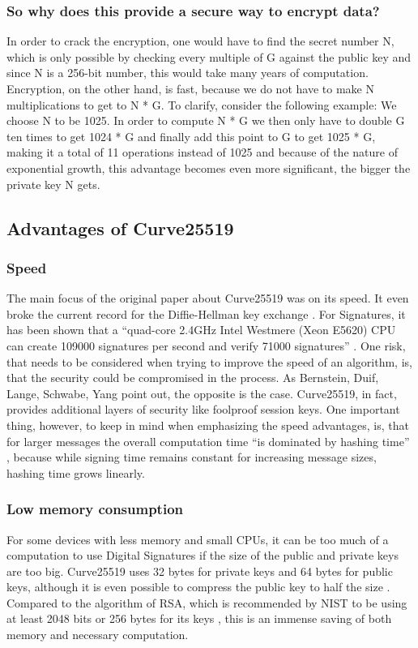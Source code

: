 \subsubsection{So why does this provide a secure way to encrypt data?}
In order to crack the encryption, one would have to find the secret number N, which is only possible by checking every multiple of G against the public key and since N is a 256-bit number, this would take many years of computation.
Encryption, on the other hand, is fast, because we do not have to make N multiplications to get to N * G. To clarify, consider the following example:
We choose N to be 1025. In order to compute N * G we then only have to double G ten times to get 1024 * G and finally add this point to G to get 1025 * G, making it a total of 11 operations instead of 1025 and because of the nature of exponential growth, this advantage becomes even more significant, the bigger the private key N gets.

\subsection{Advantages of Curve25519}
\subsubsection{Speed}
The main focus of the original paper about Curve25519 was on its speed. It even broke the current record for the Diffie-Hellman key exchange \cite{ECDH}. For Signatures, it has been shown that a ``quad-core 2.4GHz Intel Westmere (Xeon E5620) CPU can create 109000 signatures per second and verify 71000 signatures'' \cite{Curve25519}. One risk, that needs to be considered when trying to improve the speed of an algorithm, is, that the security could be compromised in the process. As Bernstein, Duif, Lange, Schwabe, Yang \cite{Curve25519} point out, the opposite is the case. Curve25519, in fact, provides additional layers of security like foolproof session keys. One important thing, however, to keep in mind when emphasizing the speed advantages, is, that for larger messages the overall computation time “is dominated by hashing time” \cite{Curve25519}, because while signing time remains constant for increasing message sizes, hashing time grows linearly. 

\subsubsection{Low memory consumption}
For some devices with less memory and small CPUs, it can be too much of a computation to use Digital Signatures if the size of the public and private keys are too big. Curve25519 uses 32 bytes for private keys and 64 bytes for public keys, although it is even possible to compress the public key to half the size \cite{ECDH}. Compared to the algorithm of RSA, which is recommended by NIST to be using at least 2048 bits or 256 bytes for its keys \cite{NistKeyMan}, this is an immense saving of both memory and necessary computation.

